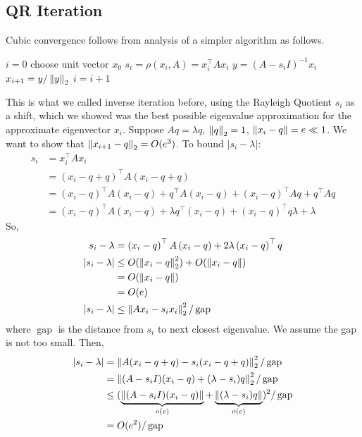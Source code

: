 \documentclass[11pt]{article}
\numberwithin{equation}{section}
\begin{document}
\subsection{QR Iteration}
Cubic convergence follows from analysis of a simpler algorithm as follows.
\begin{algorithmfrm}
    \begin{algorithmic}[1]
        \State $i = 0$
        \State choose unit vector $x_0$
        \State $s_i = \rho(x_i, A)=x_i^\top A x_i$
        \State $y = (A - s_i I)^{-1} x_i$ 
        \State $x_{i+1} = y / \left\| y \right\|_2$
        \State $i = i + 1$
        \EndWhile\label{euclidendwhile}
    \end{algorithmic}
\end{algorithmfrm}

This is what we called inverse iteration before, using the Rayleigh Quotient $s_i$ as a shift, 
which we showed was the best possible eigenvalue approximation for the approximate eigenvector $x_i$.
Suppose $Aq = \lambda q$, $\left\| q \right\|_2=1$, $\left\| x_i - q \right\| = e \ll 1$. We want to show that $\left\| x_{i+1} - q \right\|_2 = O(e^3)$. To bound $|s_i - \lambda|$:\begin{align*}
    s_{i} &= x_{i}^{\top} A x_{i} \\
    &= \left(x_{i}-q+q\right)^{\top} A\left(x_{i}-q+q\right) \\
    &= \left(x_{i}-q\right)^{\top} A\left(x_{i}-q\right) + q^\top A (x_i - q) + \left(x_{i}-q\right)^{\top} Aq + q^\top Aq \\
    &= \left(x_{i}-q\right)^{\top} A\left(x_{i}-q\right) + \lambda q^\top (x_i - q) + \left(x_{i}-q\right)^{\top} q \lambda + \lambda
\end{align*}
So, \begin{align*}
    s_i - \lambda &= \left(x_{i}-q\right)^{\top} A\left(x_{i}-q\right) + 2\lambda \left(x_{i}-q\right)^{\top} q \\
    |s_i - \lambda| &\leq O(\left\| x_i - q \right\|_2^2) + O(\left\| x_i - q \right\|) \\
    &= O(\left\| x_i - q \right\|) \\
    &= O(e) \\
    |s_i - \lambda| &\leq \left\| Ax_i - s_i x_i \right\|_2^2 / \operatorname{gap}
\end{align*}
where $\operatorname{gap}$ is the distance from $s_i$ to next closest eigenvalue. We assume the gap is not too small. Then, \begin{align*}
    |s_i - \lambda| &= \left\| A(x_i-q+q) - s_i (x_i-q+q) \right\|_2^2 / \operatorname{gap} \\
    &= \left\| (A - s_i I)(x_i-q) + (\lambda - s_i) q \right\|_2^2 / \operatorname{gap} \\
    &\leq ( \underbrace{\left\| (A - s_i I)(x_i-q) \right\|}_{o(e)} + \underbrace{\left\| (\lambda - s_i) q \right\|}_{o(e)} )^2 / \operatorname{gap} \\
    &= O(e^2) / \operatorname{gap}
\end{align*}
\end{document}
